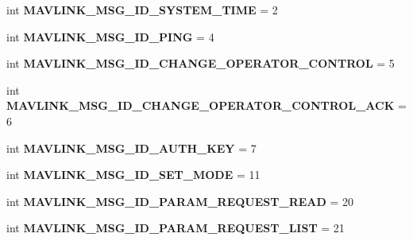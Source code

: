 \begin{DoxyCompactItemize}
\item 
\mbox{\label{namespacepymavlink_1_1dialects_1_1v10_a3590b9a586de49bd980ac776796cfc2c}} 
int {\bfseries M\+A\+V\+L\+I\+N\+K\+\_\+\+M\+S\+G\+\_\+\+I\+D\+\_\+\+S\+Y\+S\+T\+E\+M\+\_\+\+T\+I\+ME} = 2
\item 
\mbox{\label{namespacepymavlink_1_1dialects_1_1v10_a26d34223a57687d0b56b3b6c2d6cdb49}} 
int {\bfseries M\+A\+V\+L\+I\+N\+K\+\_\+\+M\+S\+G\+\_\+\+I\+D\+\_\+\+P\+I\+NG} = 4
\item 
\mbox{\label{namespacepymavlink_1_1dialects_1_1v10_a18f126f3e081fc474318e1e1fcebf666}} 
int {\bfseries M\+A\+V\+L\+I\+N\+K\+\_\+\+M\+S\+G\+\_\+\+I\+D\+\_\+\+C\+H\+A\+N\+G\+E\+\_\+\+O\+P\+E\+R\+A\+T\+O\+R\+\_\+\+C\+O\+N\+T\+R\+OL} = 5
\item 
\mbox{\label{namespacepymavlink_1_1dialects_1_1v10_acf2d019062a4818e9845d288775a5328}} 
int {\bfseries M\+A\+V\+L\+I\+N\+K\+\_\+\+M\+S\+G\+\_\+\+I\+D\+\_\+\+C\+H\+A\+N\+G\+E\+\_\+\+O\+P\+E\+R\+A\+T\+O\+R\+\_\+\+C\+O\+N\+T\+R\+O\+L\+\_\+\+A\+CK} = 6
\item 
\mbox{\label{namespacepymavlink_1_1dialects_1_1v10_a1686984a16bab9e47d1863e71ea28053}} 
int {\bfseries M\+A\+V\+L\+I\+N\+K\+\_\+\+M\+S\+G\+\_\+\+I\+D\+\_\+\+A\+U\+T\+H\+\_\+\+K\+EY} = 7
\item 
\mbox{\label{namespacepymavlink_1_1dialects_1_1v10_a498ad5432dd55f833ca57cb17459da20}} 
int {\bfseries M\+A\+V\+L\+I\+N\+K\+\_\+\+M\+S\+G\+\_\+\+I\+D\+\_\+\+S\+E\+T\+\_\+\+M\+O\+DE} = 11
\item 
\mbox{\label{namespacepymavlink_1_1dialects_1_1v10_abfc750ddbf57f0771e8b4d9b813c0bf7}} 
int {\bfseries M\+A\+V\+L\+I\+N\+K\+\_\+\+M\+S\+G\+\_\+\+I\+D\+\_\+\+P\+A\+R\+A\+M\+\_\+\+R\+E\+Q\+U\+E\+S\+T\+\_\+\+R\+E\+AD} = 20
\item 
\mbox{\label{namespacepymavlink_1_1dialects_1_1v10_aec0fa2f824a71b169a0f7baf36d0100c}} 
int {\bfseries M\+A\+V\+L\+I\+N\+K\+\_\+\+M\+S\+G\+\_\+\+I\+D\+\_\+\+P\+A\+R\+A\+M\+\_\+\+R\+E\+Q\+U\+E\+S\+T\+\_\+\+L\+I\+ST} = 21

\end{DoxyCompactItemize}
